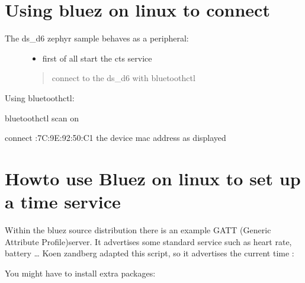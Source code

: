 \documentclass[letterpaper,10pt,english]{sphinxmanual}
\begin{document}
\section{Using bluez on linux to connect}
\label{\detokenize{current-time:using-bluez-on-linux-to-connect}}\begin{description}
\item[{The ds\_d6 zephyr sample behaves as a peripheral:}] \leavevmode\begin{itemize}
\item {} 
first of all start the cts service

\end{itemize}
\begin{quote}

\sphinxhyphen{}connect to the ds\_d6 with bluetoothctl
\end{quote}

\end{description}

Using bluetoothctl:

\begin{sphinxVerbatim}[commandchars=\\\{\}]
bluetoothctl
scan on


connect :7C:9E:92:50:C1 the device mac address as displayed
\end{sphinxVerbatim}


\section{Howto use Bluez on linux to set up a time service}
\label{\detokenize{current-time:howto-use-bluez-on-linux-to-set-up-a-time-service}}
Within the bluez source distribution there is an example GATT (Generic Attribute Profile)server. It advertises some standard service such as heart rate, battery …
Koen zandberg adapted this script, so it advertises the current time :

You might have to install extra packages:

\begin{sphinxVerbatim}[commandchars=\\\{\}]
\end{sphinxVerbatim}
\end{document}
